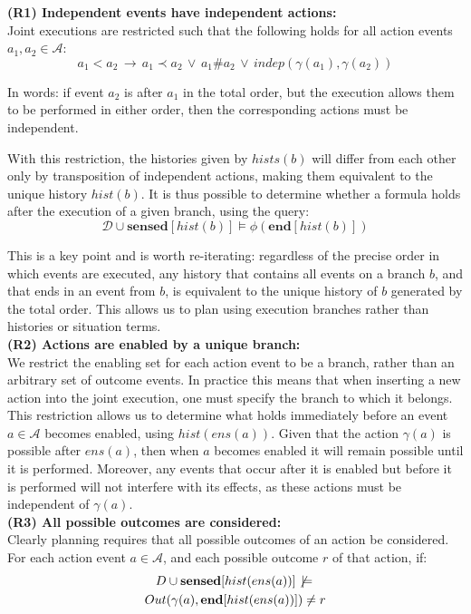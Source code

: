 \textbf{(R1) Independent events have independent actions:}\\
Joint executions are restricted such that the following holds for
all action events $a_{1},a_{2}\in\mathcal{A}$:\[
a_{1}<a_{2}\,\rightarrow\, a_{1}\prec a_{2}\,\vee\, a_{1}\#a_{2}\,\vee\, indep(\gamma(a_{1}),\gamma(a_{2}))\]


In words: if event $a_{2}$ is after $a_{1}$ in the total order,
but the execution allows them to be performed in either order, then
the corresponding actions must be independent. 

With this restriction, the histories given by $hists(b)$ will differ
from each other only by transposition of independent actions, making
them equivalent to the unique history $hist(b)$. It is thus possible
to determine whether a formula holds after the execution of a given
branch, using the query:\[
\mathcal{D}\cup\mathbf{sensed}[hist(b)]\models\phi(\mathbf{end}[hist(b)])\]


This is a key point and is worth re-iterating: regardless of the precise
order in which events are executed, any history that contains all
events on a branch $b$, and that ends in an event from $b$, is equivalent
to the unique history of $b$ generated by the total order. This allows
us to plan using execution branches rather than histories or situation
terms.\\


\textbf{(R2) Actions are enabled by a unique branch:}\\
We restrict the enabling set for each action event to be a branch,
rather than an arbitrary set of outcome events. In practice this means
that when inserting a new action into the joint execution, one must
specify the branch to which it belongs. This restriction allows us
to determine what holds immediately before an event $a\in\mathcal{A}$
becomes enabled, using $hist(ens(a))$. Given that the action $\gamma(a)$
is possible after $ens(a)$, then when $a$ becomes enabled it will
remain possible until it is performed. Moreover, any events that occur
after it is enabled but before it is performed will not interfere
with its effects, as these actions must be independent of $\gamma(a)$.
\\


\textbf{(R3) All possible outcomes are considered:}\\
Clearly planning requires that all possible outcomes of an action
be considered. For each action event $a\in\mathcal{A}$, and each
possible outcome $r$ of that action, if:\begin{multline*}
D\cup\mathbf{sensed}[hist(ens(a))]\not\,\models\,\\
Out(\gamma(a),\mathbf{end}[hist(ens(a))])\neq r\end{multline*}



